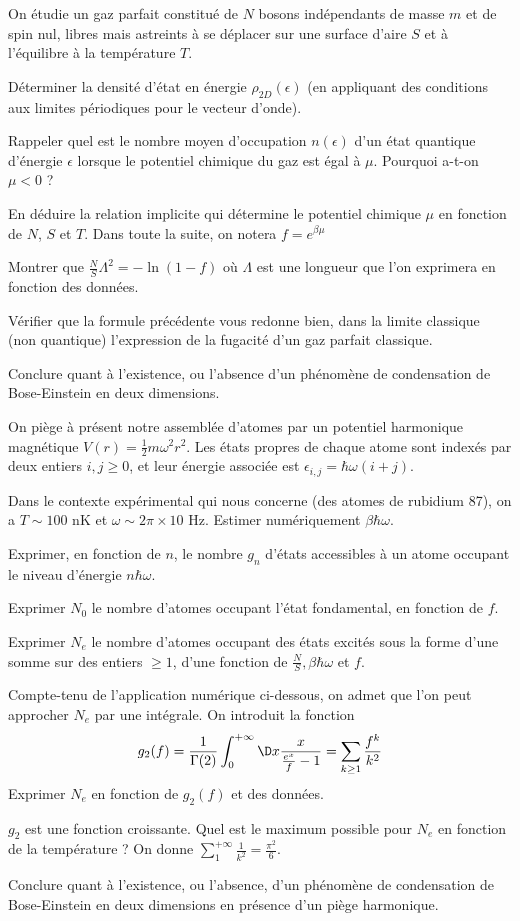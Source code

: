 On étudie un gaz parfait constitué de $N$ bosons indépendants de masse $m$ et de spin nul, libres mais astreints à se déplacer sur une surface d'aire $S$ et à l'équilibre à la température $T$.

\question
Déterminer la densité d'état en énergie $\rho_{2D}(\epsilon)$ (en appliquant des conditions aux limites périodiques pour le vecteur d'onde). 

\question
Rappeler quel est le nombre moyen d'occupation $n(\epsilon)$ d'un état quantique d'énergie $\epsilon$ lorsque le potentiel chimique du gaz est égal à $\mu$. Pourquoi a-t-on $\mu<0$ ?

\question
En déduire la relation implicite qui détermine le potentiel chimique $\mu$ en fonction de $N$, $S$ et $T$. Dans toute la suite, on notera $f=e^{\beta \mu}$

\question
Montrer que $\frac{N}{S}\Lambda^2=-\ln (1-f)$ où $\Lambda$ est une longueur que l'on exprimera en fonction des données.

\question
Vérifier que la formule précédente vous redonne bien, dans la limite classique (non quantique)
l'expression de la fugacité d'un gaz parfait classique.

\question
Conclure quant à l'existence, ou l'absence d'un phénomène de condensation de Bose-Einstein en deux dimensions.

\medskip

On piège à présent notre assemblée d'atomes par un potentiel harmonique magnétique $V(r)=\frac{1}{2}m\omega^2 r^2$. Les états propres de chaque atome sont indexés par deux entiers $i, j \geq 0$, et leur énergie associée est $\epsilon_{i,j} = \hbar \omega (i + j)$. 

\question
Dans le contexte expérimental qui nous concerne (des atomes de rubidium 87), on a  $T \sim 100$ nK et $\omega \sim 2\pi \times 10$ Hz. Estimer numériquement $\beta \hbar \omega$.

\question
Exprimer, en fonction de $n$, le nombre $g_n$ d'états accessibles à un atome
occupant le niveau d'énergie $n \hbar \omega$.

\question
Exprimer $N_0$ le nombre d'atomes occupant l'état fondamental, en fonction de $f$.

\question
Exprimer $N_e$ le nombre d'atomes occupant des états excités sous la forme d'une somme sur des entiers $\geq 1$, d'une fonction de $\frac{N}{S}, \beta \hbar \omega$ et $f$. 

\question
Compte-tenu de l'application numérique ci-dessous, on admet que l'on peut approcher $N_e$ par une intégrale. On introduit la fonction
$$
g_2(f)=\frac{1}{\Gamma(2)} \int_0^{+\infty} \D x \frac{x}{\frac{e^x}{f}-1} = \sum_{k\geq 1} \frac{f^k}{k^2}
$$
Exprimer $N_e$ en fonction de $g_2(f)$ et des données.

\question
$g_2$ est une fonction croissante. Quel est le maximum possible pour $N_e$ en fonction de la température ?  On donne $\sum_1^{+\infty} \frac{1}{k^2}=\frac{\pi^2}{6}$.

\question
Conclure quant à l'existence, ou l'absence, d'un phénomène de condensation de Bose-Einstein en deux dimensions en présence d'un piège harmonique.

